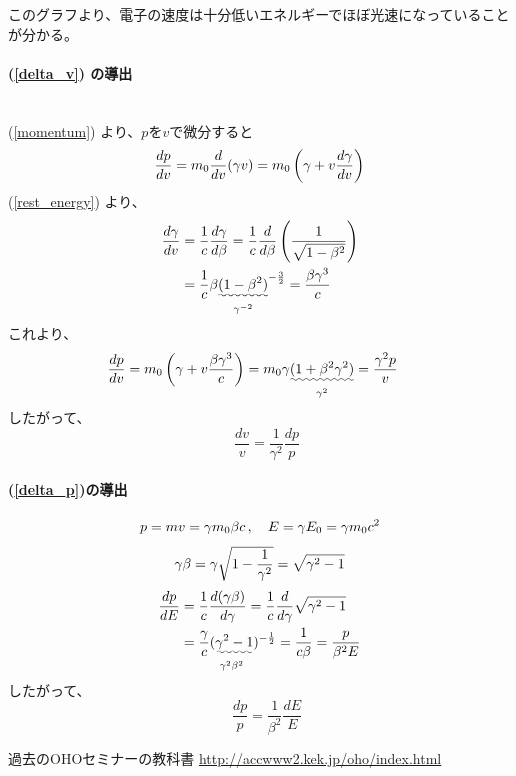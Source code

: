 \documentclass[10pt,a4paper]{jlreq}
\begin{document}
このグラフより、電子の速度は十分低いエネルギーでほぼ光速になっていることが分かる。
%
\paragraph{(\ref{delta_v}) の導出} \leavevmode\\

(\ref{momentum}) より、$p$を$v$で微分すると
%
\begin{equation}
  \frac{dp}{dv} = m_0\frac{d}{dv}(\gamma v)
  = m_0 \left(\gamma + v \frac{d\gamma}{dv}\right) \notag
\end{equation}
%
(\ref{rest_energy}) より、
%
\begin{align}
  \frac{d\gamma}{dv} & = \frac{1}{c}\frac{d\gamma}{d\beta}= \frac{1}{c}\frac{d}{d\beta}\left(\frac{1}{\sqrt{1-\beta^2}}\right) \notag \\
  & = \frac{1}{c} \beta \underset{\gamma^{-2}}{\uwave{(1-\beta^2)}}^{-\frac{3}{2}} = \frac{\beta \gamma^3}{c} \notag
\end{align}
%
これより、
\begin{align}
  \frac{dp}{dv} & = m_0 \left(\gamma + v \frac{\beta \gamma^3}{c}\right)
  = m_0 \gamma \underset{\gamma^2}{\uwave{(1 + \beta^2 \gamma^2)}}
  = \frac{\gamma^2 p}{v} \notag
\end{align}
%
したがって、
%
\begin{equation}
  \quad \frac{dv}{v} = \frac{1}{\gamma^2}\frac{dp}{p}
  \label{dv_dp}
\end{equation}
%
\paragraph{(\ref{delta_p})の導出}
%
\begin{align}
  p = mv = \gamma m_0 \beta c\,  , \quad E = \gamma E_0 = \gamma m_0 c^2 \notag
\end{align}
%
\begin{equation}
  \gamma \beta = \gamma \sqrt{1-\frac{1}{\gamma^2}} \notag = \sqrt{\gamma^2 -1} \notag
\end{equation}
%
\begin{align}
  \frac{dp}{dE} & = \frac{1}{c}\frac{d(\gamma \beta)}{d\gamma} = \frac{1}{c}\frac{d}{d\gamma}\sqrt{\gamma^2 -1} \notag \\
  & = \frac{\gamma}{c} \underset{\gamma^2\beta^2}{(\uwave{\gamma^2 -1}})^{-\frac{1}{2}} = \frac{1}{c\beta}
  = \frac{p}{\beta^2 E}\notag
\end{align}
%
したがって、
%
\begin{equation}
  \quad \frac{dp}{p} = \frac{1}{\beta^2}\frac{dE}{E}
  \label{dp_de}
\end{equation}

%
\begin{thebibliography}{9}
  過去のOHOセミナーの教科書 \url{http://accwww2.kek.jp/oho/index.html}
\end{thebibliography}
%
\end{document}
